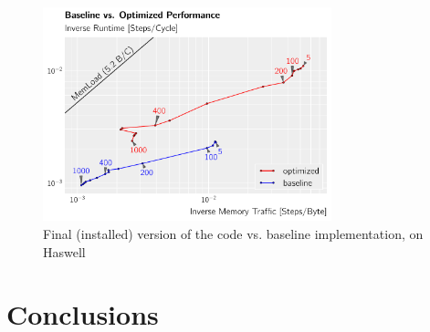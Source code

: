 \documentclass[letterpaper]{article}
\begin{document}
	\begin{figure}[h]\centering
		  \includegraphics[width = 8.36cm]{plots/roofline_0.pdf}
		  \caption{Final (installed) version of the code vs.  baseline implementation, on Haswell}
		  \label{roof:optvsbase}
	\end{figure}


\section{Conclusions}



\end{document}
